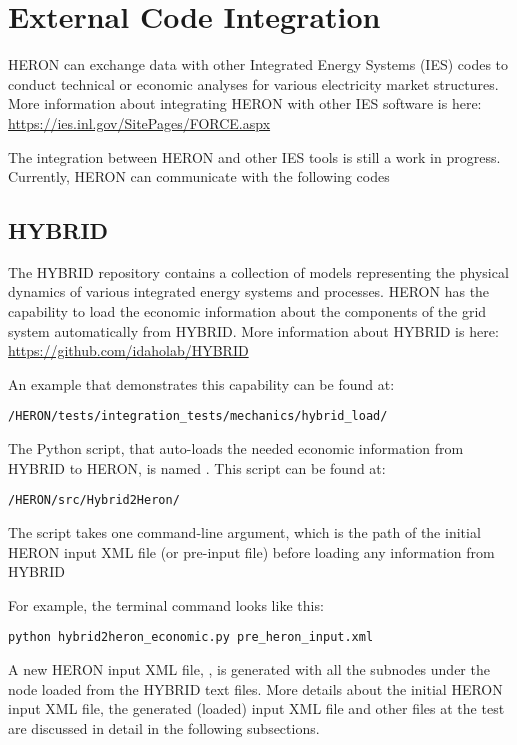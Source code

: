\section{External Code Integration}
HERON can exchange data with other Integrated Energy Systems (IES) codes to conduct technical or economic analyses for various electricity market structures. More information about integrating HERON with other IES software is here: \url{https://ies.inl.gov/SitePages/FORCE.aspx}

The integration between HERON and other IES tools is still a work in progress. Currently, HERON can communicate with the following codes

\subsection{HYBRID}
The HYBRID repository contains a collection of models representing the physical dynamics of various integrated energy systems and processes. HERON has the capability to load the economic information about the components of the grid system automatically from HYBRID. More information about HYBRID is here: \url{https://github.com/idaholab/HYBRID}

An example that demonstrates this capability can be found at: 
\begin{lstlisting}
/HERON/tests/integration_tests/mechanics/hybrid_load/
\end{lstlisting}

The Python script, that auto-loads the needed economic information from HYBRID to HERON, is named . This script can be found at:
\begin{lstlisting}
/HERON/src/Hybrid2Heron/
\end{lstlisting}


The  script takes one command-line argument, which is the path of the initial HERON input XML file (or pre-input file) before loading any information from HYBRID

For example, the terminal command looks like this:
\begin{lstlisting}
python hybrid2heron_economic.py pre_heron_input.xml
\end{lstlisting}
A new HERON input XML file, , is generated with all the subnodes under the  node loaded from the HYBRID text files. More details about the initial HERON input XML file, the generated (loaded) input XML file and other files at the  test are discussed in detail in the following subsections. 

